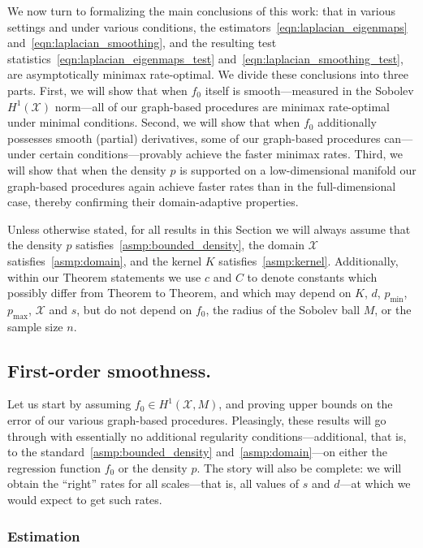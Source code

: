 \documentclass{article}
\newcommand{\1}{\mathbf{1}}
\newcommand{\Xset}{\mathcal{X}}
\theoremstyle{alden}
\theoremstyle{aldenthm}
\theoremstyle{definition}
\theoremstyle{remark}
\begin{document}
We now turn to formalizing the main conclusions of this work: that in various settings and under various conditions, the estimators~\eqref{eqn:laplacian_eigenmaps} and~\eqref{eqn:laplacian_smoothing}, and the resulting test statistics~\eqref{eqn:laplacian_eigenmaps_test} and~\eqref{eqn:laplacian_smoothing_test}, are asymptotically minimax rate-optimal. We divide these conclusions into three parts. First, we will show that when $f_0$ itself is smooth---measured in the Sobolev $H^1(\Xset)$ norm---all of our graph-based procedures are minimax rate-optimal under minimal conditions. Second, we will show that when $f_0$ additionally possesses smooth (partial) derivatives, some of our graph-based procedures can---under certain conditions---provably achieve the faster minimax rates. Third, we will show that when the density $p$ is supported on a low-dimensional manifold our graph-based procedures again achieve faster rates than in the full-dimensional case, thereby confirming their domain-adaptive properties. 

Unless otherwise stated, for all results in this Section we will always assume that the density $p$ satisfies~\ref{asmp:bounded_density}, the domain $\Xset$ satisfies~\ref{asmp:domain}, and the kernel $K$ satisfies~\ref{asmp:kernel}. Additionally, within our Theorem statements we use $c$ and $C$ to denote constants which possibly differ from Theorem to Theorem,  and which may depend on $K$, $d$, $p_{\min}$, $p_{\max}$, $\Xset$ and $s$, but do not depend on $f_0$, the radius of the Sobolev ball $M$, or the sample size $n$.

\subsection{First-order smoothness.}
\label{subsec:minimax_first_order_smoothness}
Let us start by assuming $f_0 \in H^1(\Xset,M)$, and proving upper bounds on the error of our various graph-based procedures. Pleasingly, these results will go through with essentially no additional regularity conditions---additional, that is, to the standard~\ref{asmp:bounded_density} and~\ref{asmp:domain}---on either the regression function $f_0$ or the density $p$. The story will also be complete: we will obtain the ``right'' rates for all scales---that is, all values of $s$ and $d$---at which we would expect to get such rates.

\subsubsection{Estimation}
\label{subsubsec:first_order_smoothness_estimation}
\end{document}
